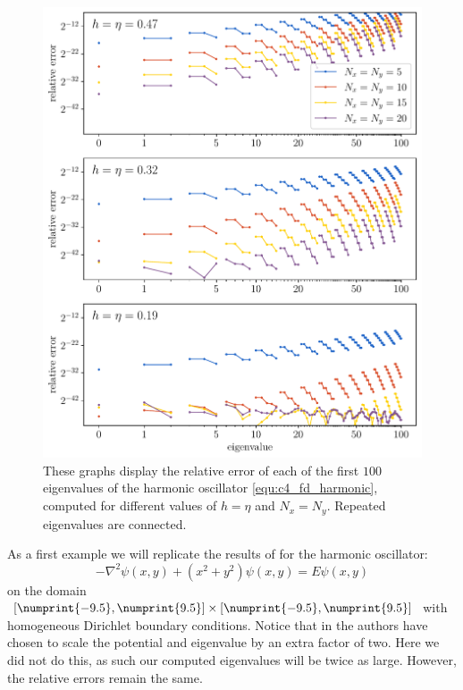 \begin{figure}
    \begin{center}
        \includegraphics[width=\textwidth]{img/chapter4/fd_harmonic.pdf}
    \end{center}
    \caption{These graphs display the relative error of each of the first $100$ eigenvalues of the harmonic oscillator \eqref{equ:c4_fd_harmonic}, computed for different values of $h = \eta$ and $N_x = N_y$. Repeated eigenvalues are connected.}
    \label{fig:c4_fd_harmonic}
\end{figure}

As a first example we will replicate the results of \cite{wang_new_2009} for the harmonic oscillator:
\begin{equation}\label{equ:c4_fd_harmonic}
    -\nabla^2 \psi(x, y) + \left(x^2 + y^2\right) \psi(x, y) = E \psi(x, y)
\end{equation}
on the domain $[\numprint{-9.5}, \numprint{9.5}] \times [\numprint{-9.5}, \numprint{9.5}]$ with homogeneous Dirichlet boundary conditions. Notice that in \cite{wang_new_2009} the authors have chosen to scale the potential and eigenvalue by an extra factor of two. Here we did not do this, as such our computed eigenvalues will be twice as large. However, the relative errors remain the same.

